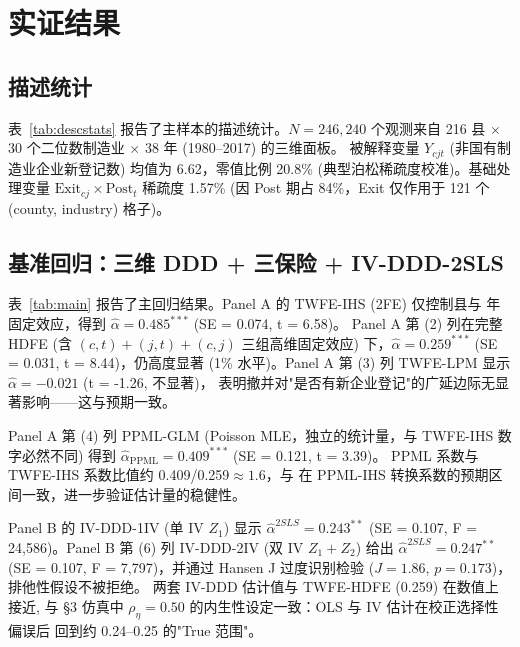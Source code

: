 \section{实证结果}\label{sec:main}

\subsection{描述统计}

表~\ref{tab:descstats} 报告了主样本的描述统计。$N=246{,}240$ 个观测来自
216 县 $\times$ 30 个二位数制造业 $\times$ 38 年 (1980--2017) 的三维面板。
被解释变量 $Y_{cjt}$ (非国有制造业企业新登记数) 均值为 6.62，零值比例 20.8\%
(典型泊松稀疏度校准)。基础处理变量 $\mathrm{Exit}_{cj}\times\mathrm{Post}_t$ 稀疏度 1.57\%
(因 Post 期占 84\%，Exit 仅作用于 121 个 (county, industry) 格子)。



\subsection{基准回归：三维 DDD + 三保险 + IV-DDD-2SLS}

表~\ref{tab:main} 报告了主回归结果。Panel A 的 TWFE-IHS (2FE) 仅控制县与
年固定效应，得到 $\hat{\alpha}=0.485^{***}$ (SE = 0.074, t = 6.58)。
Panel A 第 (2) 列在完整 HDFE (含 $(c,t)+(j,t)+(c,j)$ 三组高维固定效应)
下，$\hat{\alpha}=0.259^{***}$ (SE = 0.031, t = 8.44)，仍高度显著
(1\% 水平)。Panel A 第 (3) 列 TWFE-LPM 显示 $\hat{\alpha}=-0.021$ (t = -1.26, 不显著)，
表明撤并对"是否有新企业登记"的广延边际无显著影响——这与预期一致。

Panel A 第 (4) 列 PPML-GLM (Poisson MLE，独立的统计量，与 TWFE-IHS
数字必然不同) 得到 $\hat{\alpha}_{\mathrm{PPML}}=0.409^{***}$ (SE = 0.121, t = 3.39)。
PPML 系数与 TWFE-IHS 系数比值约 0.409/0.259$\approx 1.6$，与 \citet{silva2022}
在 PPML-IHS 转换系数的预期区间一致，进一步验证估计量的稳健性。

Panel B 的 IV-DDD-1IV (单 IV $Z_1$) 显示 $\hat{\alpha}^{2SLS}=0.243^{**}$
(SE = 0.107, F = 24,586)。Panel B 第 (6) 列 IV-DDD-2IV (双 IV $Z_1+Z_2$)
给出 $\hat{\alpha}^{2SLS}=0.247^{**}$ (SE = 0.107, F = 7,797)，并通过
Hansen J 过度识别检验 ($J=1.86$, $p=0.173$)，排他性假设不被拒绝。
两套 IV-DDD 估计值与 TWFE-HDFE (0.259) 在数值上接近, 与 §3 仿真中
$\rho_{\eta}=0.50$ 的内生性设定一致：OLS 与 IV 估计在校正选择性偏误后
回到约 0.24--0.25 的"True 范围"。

